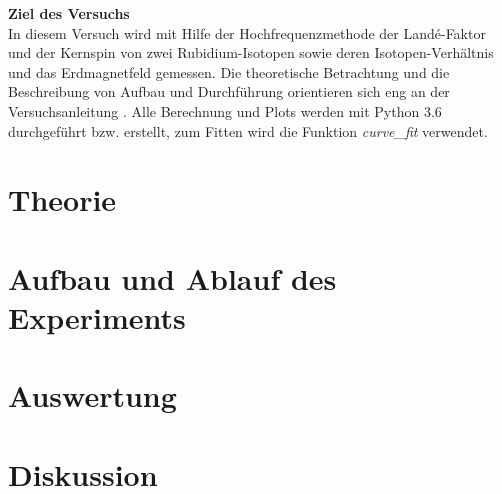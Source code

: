 \documentclass[a4,11pt]{article}
\newcommand{\V}{V21}
\begin{document}



\tableofcontents
\clearpage



\textbf{Ziel des Versuchs} \\
In diesem Versuch wird mit Hilfe der Hochfrequenzmethode der Landé-Faktor und der Kernspin von zwei Rubidium-Isotopen sowie deren Isotopen-Verhältnis und das Erdmagnetfeld gemessen.
Die theoretische Betrachtung und die Beschreibung von Aufbau und Durchführung orientieren sich eng an der Versuchsanleitung \cite{\V}. Alle Berechnung und Plots werden mit Python 3.6 durchgeführt bzw. erstellt, zum Fitten wird die Funktion \textit{curve\_fit} verwendet.

\section{Theorie}

\clearpage


\section{Aufbau und Ablauf des Experiments}

\clearpage


\section{Auswertung}

\clearpage


\section{Diskussion}


\clearpage
\listoffigures
\listoftables
\clearpage
\nocite{\V}
\printbibliography[title = Literaturverzeichnis]
\end{document}
